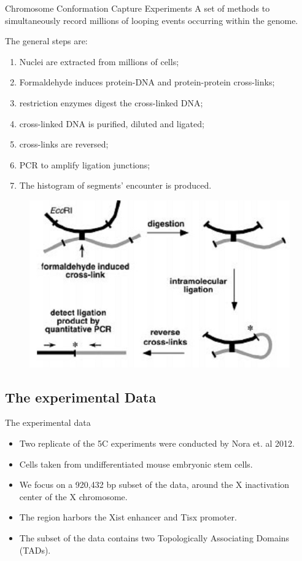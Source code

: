 \documentclass[8pt]{beamer}
\begin{document}
\begin{frame}{Chromosome Conformation Capture Experiments}
A set of methods to simultaneously record millions of looping events occurring within the genome. 

The general steps are:
\begin{enumerate}
\item Nuclei are extracted from millions of cells;
\item Formaldehyde induces protein-DNA and protein-protein cross-links;
\item restriction enzymes digest the cross-linked DNA;
\item cross-linked DNA is purified, diluted and ligated;
\item cross-links are reversed;
\item PCR to amplify ligation junctions;
\item The histogram of segments' encounter is produced.
\end{enumerate}
\begin{figure}[H]
\includegraphics[scale=0.3]{3Cschematic}
\end{figure}
\end{frame}

\subsection{The experimental Data}\label{subsection_theExperimentalData}

\begin{frame}{The experimental data}
\begin{itemize}
\item Two replicate of the 5C experiments were conducted by Nora et. al 2012. 
\item Cells taken from undifferentiated mouse embryonic stem cells.
\item We focus on a 920,432 bp subset of the data, around the X inactivation center of the X chromosome. 
\item The region harbors the Xist enhancer and Tisx promoter.
\item The subset of the data contains two Topologically Associating Domains (TADs).
\end{itemize}
\end{frame}
\end{document}

